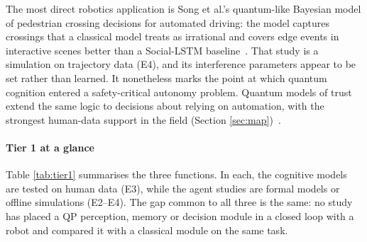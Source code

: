 \documentclass[pdflatex,sn-basic]{sn-jnl}
\begin{document}
The most direct robotics application is Song et al.'s quantum-like Bayesian model of pedestrian crossing decisions for automated driving: the model captures crossings that a classical model treats as irrational and covers edge events in interactive scenes better than a Social-LSTM baseline~\citep{Song2022}. That study is a simulation on trajectory data (E4), and its interference parameters appear to be set rather than learned. It nonetheless marks the point at which quantum cognition entered a safety-critical autonomy problem. Quantum models of trust extend the same logic to decisions about relying on automation, with the strongest human-data support in the field (Section \ref{sec:map})~\citep{Roeder2023}.

\paragraph{Tier 1 at a glance} Table \ref{tab:tier1} summarises the three functions. In each, the cognitive models are tested on human data (E3), while the agent studies are formal models or offline simulations (E2--E4). The gap common to all three is the same: no study has placed a QP perception, memory or decision module in a closed loop with a robot and compared it with a classical module on the same task.
\end{document}
